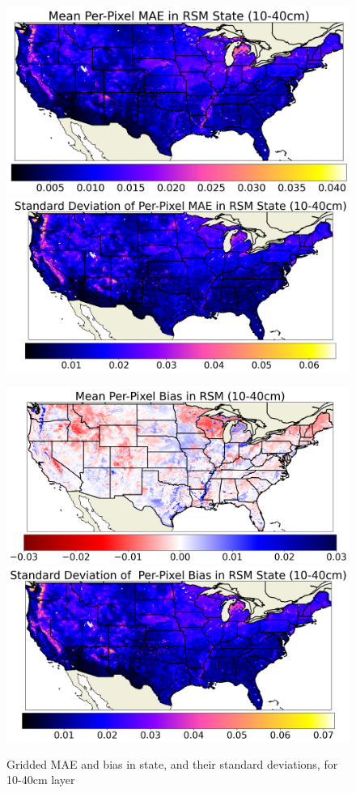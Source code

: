 \begin{figure}[hp!]
    \centering

    \includegraphics[width=.48\linewidth,draft=false]{figures/grid-eval_lstm-rsm-9_full/eval-grid_full_lstm-rsm-9_rsm-40_spatial-stats_abs-err_state-err-abs-mean.png}
    \includegraphics[width=.48\linewidth,draft=false]{figures/grid-eval_lstm-rsm-9_full/eval-grid_full_lstm-rsm-9_rsm-40_spatial-stats_abs-err_state-err-abs-stdev.png}

    \includegraphics[width=.48\linewidth,draft=false]{figures/grid-eval_lstm-rsm-9_full/eval-grid_full_lstm-rsm-9_rsm-40_spatial-stats_bias_state-err-bias-mean.png}
    \includegraphics[width=.48\linewidth,draft=false]{figures/grid-eval_lstm-rsm-9_full/eval-grid_full_lstm-rsm-9_rsm-40_spatial-stats_bias_state-err-bias-stdev.png}

    \caption{Gridded MAE and bias in state, and their standard deviations, for 10-40cm layer}
    \label{acclstm-rsm-9-grid-rsm-40}
\end{figure}

